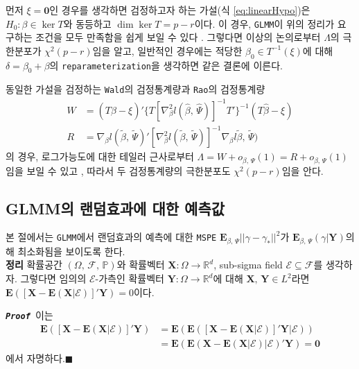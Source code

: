 \documentclass[11pt,onecolumn,twoside,a4size]{gsag3jnl}
\newcommand{\proof}{\texttt{\textit{\textbf{Proof }}}}
\begin{document}
먼저 $\xi=\mathbf{0}$인 경우를 생각하면 검정하고자 하는 가설(식 \ref{eq:linearHypo})은 $H_0:\beta\in \ker T$와 동등하고 $\dim\ker T=p-r$이다. 이 경우, \texttt{GLMM}이 위의 정리가 요구하는 조건을 모두 만족함을 쉽게 보일 수 있다 \texttt{\citep{van2000asymptotic}}. 그렇다면 이상의 논의로부터 $\Lambda$의 극한분포가 $\chi^2(p-r)$임을 알고, 일반적인 경우에는 적당한 $\beta_0\in T^{-1}(\xi)$에 대해 $\delta=\beta_0+\beta$의 \texttt{reparameterization}을 생각하면 같은 결론에 이른다.

동일한 가설을 검정하는 \texttt{Wald}의 검정통계량과 \texttt{Rao}의 검정통계량
\begin{align}
  W&=(T\widehat{\beta}-\xi)'\{T[\nabla^2_\beta l(\widehat{\beta},\,\widehat{\Psi})]^{-1}T'\}^{-1}(T\widehat{\beta}-\xi)\\
  R&=\nabla_\beta l(\widetilde{\beta},\,\widetilde{\Psi})'[\nabla^2_\beta l(\widetilde{\beta},\,\widetilde{\Psi})]^{-1}\nabla_\beta l\widetilde{\beta},\,\widetilde{\Psi})
\end{align}
의 경우, 로그가능도에 대한 테일러 근사로부터 $\Lambda=W+o_{\beta,\,\Psi}(1)=R+o_{\beta,\,\Psi}(1)$임을 보일 수 있고 \texttt{\citep{bickel2015mathematical}}, 따라서 두 검정통계량의 극한분포도 $\chi^2(p-r)$임을 안다.

\subsection{GLMM의 랜덤효과에 대한 예측값}

본 절에서는 \texttt{GLMM}에서 랜덤효과의 예측에 대한 \texttt{MSPE} $\mathbf{E}_{\beta,\,\Psi}||\gamma-\gamma_*||^2$가 $\mathbf{E}_{\beta,\,\Psi}(\gamma\vert\mathbf{Y})$의해 최소화됨을 보이도록 한다.\\

\noindent\textsf{\textbf{정리} 확률공간 $(\Omega,\,\mathcal{F},\,\mathbb{P})$와  확률벡터 $\mathbf{X}:\Omega\to\mathbb{R}^d$, sub-sigma field $\mathcal{E}\subseteq\mathcal{F}$를 생각하자. 그렇다면 임의의 $\mathcal{E}$-가측인 확률벡터 $\mathbf{Y}:\Omega\to\mathbb{R}^d$에 대해 $\mathbf{X},\,\mathbf{Y}\in L^2$라면 $\mathbf{E}([\mathbf{X}-\mathbf{E}(\mathbf{X}\vert\mathcal{E})]'\mathbf{Y})=0$이다.}

\proof 이는
\begin{align}
  \mathbf{E}([\mathbf{X}-\mathbf{E}(\mathbf{X}\vert\mathcal{E})]'\mathbf{Y})&=\mathbf{E}(\mathbf{E}([\mathbf{X}-\mathbf{E}(\mathbf{X}\vert\mathcal{E})]'\mathbf{Y}\vert\mathcal{E}))\\
  &=\mathbf{E}(\mathbf{E}(\mathbf{X}-\mathbf{E}(\mathbf{X}\vert\mathcal{E})\vert\mathcal{E})'\mathbf{Y})=\mathbf{0}\nonumber
\end{align}
에서 자명하다.\hfill$\blacksquare$\\
\end{document}
